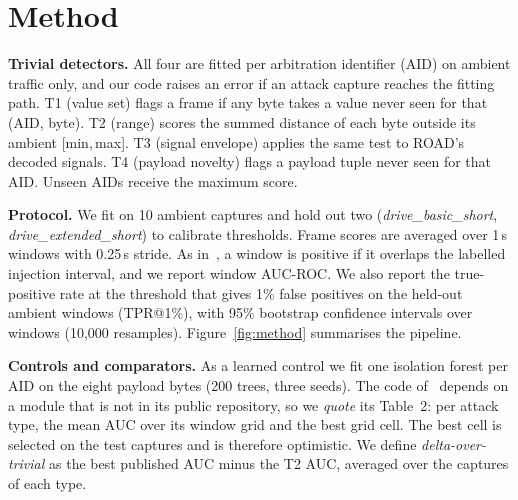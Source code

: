 \documentclass[conference]{IEEEtran}
\newcommand{\Tone}{T1}\newcommand{\Ttwo}{T2}\newcommand{\Tthree}{T3}\newcommand{\Tfour}{T4}
\begin{document}
\section{Method}
\label{sec:method}
\textbf{Trivial detectors.} All four are fitted per arbitration identifier (AID) on ambient traffic only, and our code raises an error if an attack capture reaches the fitting path.
\Tone{} (value set) flags a frame if any byte takes a value never seen for that (AID, byte).
\Ttwo{} (range) scores the summed distance of each byte outside its ambient [min,\,max].
\Tthree{} (signal envelope) applies the same test to ROAD's decoded signals.
\Tfour{} (payload novelty) flags a payload tuple never seen for that AID.
Unseen AIDs receive the maximum score.

\textbf{Protocol.} We fit on 10 ambient captures and hold out two (\emph{drive\_basic\_short}, \emph{drive\_extended\_short}) to calibrate thresholds. Frame scores are averaged over 1\,s windows with 0.25\,s stride. As in~\cite{moriano2026jisa}, a window is positive if it overlaps the labelled injection interval, and we report window AUC-ROC. We also report the true-positive rate at the threshold that gives 1\% false positives on the held-out ambient windows (TPR@1\%), with 95\% bootstrap confidence intervals over windows (10{,}000 resamples). Figure~\ref{fig:method} summarises the pipeline.

\textbf{Controls and comparators.} As a learned control we fit one isolation forest per AID on the eight payload bytes (200 trees, three seeds). The code of~\cite{moriano2026jisa} depends on a module that is not in its public repository, so we \emph{quote} its Table~2: per attack type, the mean AUC over its window grid and the best grid cell. The best cell is selected on the test captures and is therefore optimistic. We define \emph{delta-over-trivial} as the best published AUC minus the \Ttwo{} AUC, averaged over the captures of each type.
\end{document}
